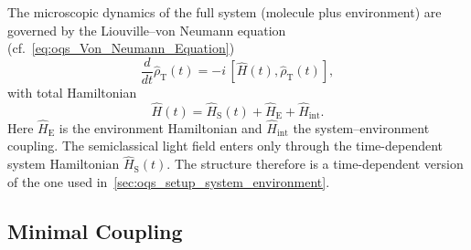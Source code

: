 The microscopic dynamics of the full system (molecule plus environment) are governed by the Liouville--von Neumann equation (cf.~\autoref{eq:oqs_Von_Neumann_Equation})
\begin{equation*}
	\frac{d}{dt}\hat{\rho}_{\mathrm{T}}(t) = -i\,[\hat{H}(t),\hat{\rho}_{\mathrm{T}}(t)],
\end{equation*}
with total Hamiltonian
\begin{equation*}
	\hat{H}(t)=\hat{H}_{\mathrm{S}}(t)+\hat{H}_{\mathrm{E}}+\hat{H}_{\mathrm{int}}.
\end{equation*}
Here $\hat{H}_{\mathrm{E}}$ is the environment Hamiltonian and $\hat{H}_{\mathrm{int}}$ the system--environment coupling.
The semiclassical light field enters only through the time-dependent system Hamiltonian $\hat{H}_{\mathrm{S}}(t)$.
The structure therefore is a time-dependent version of the one used in~\autoref{sec:oqs_setup_system_environment}.

\subsection{Minimal Coupling}
\label{subsec:spctr_minimal_coupling}

